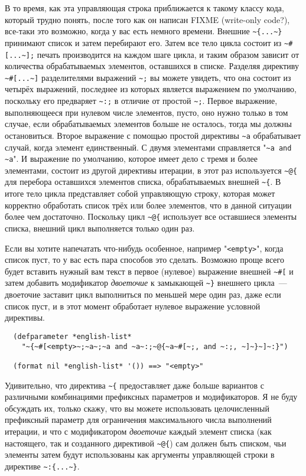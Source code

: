 В то время, как эта управляющая строка приближается к такому классу кода, который трудно понять, после того как
он написан FIXME (write-only code?), все-таки это возможно, когда у вас есть немного времени. Внешние
\lstinline!~{...~}! принимают список и затем перебирают его. Затем все тело цикла состоит из \lstinline!~#[...~];! печать
производится на каждом шаге цикла, и таким образом зависит от количества обрабатываемых элементов, оставшихся в
списке. Разделяя директиву \lstinline!~#[...~]! разделителями выражений \lstinline!~;! вы можете увидеть, что она состоит из
четырёх выражений, последнее из которых является выражением по умолчанию, поскольку его предваряет \lstinline!~:;! в
отличие от простой \lstinline!~;!. Первое выражение, выполняющееся при нулевом числе элементов, пусто, оно нужно только
в том случае, если обрабатываемых элементов больше не осталось, тогда мы должны остановиться. Второе выражение с
помощью простой директивы \lstinline!~a! обрабатывает случай, когда элемент единственный. С двумя элементами справляется
"\lstinline!~a and ~a!". И выражение по умолчанию, которое имеет дело с тремя и более элементами, состоит из другой
директивы итерации, в этот раз используется \lstinline!~@{! для перебора оставшихся элементов списка, обрабатываемых внешней
\lstinline!~{!. В итоге тело цикла представляет собой управляющую строку, которая может корректно обработать список трёх
или более элементов, что в данной ситуации более чем достаточно. Поскольку цикл \lstinline!~@{! использует все
оставшиеся элементы списка, внешний цикл выполняется только один раз.

Если вы хотите напечатать что-нибудь особенное, например "\lstinline!<empty>!", когда
список пуст, то у вас есть пара способов это сделать. Возможно проще всего будет вставить
нужный вам текст в первое (нулевое) выражение внешней \lstinline!~#[! и затем добавить
модификатор \textit{двоеточие} к замыкающей \lstinline!~}! внешнего цикла~--- двоеточие
заставит цикл выполниться по меньшей мере один раз, даже если список пуст, и в этот момент
 обработает нулевое выражение условной директивы.

\begin{verbatim}
  (defparameter *english-list*
    "~{~#[<empty>~;~a~;~a and ~a~:;~@{~a~#[~;, and ~:;, ~]~}~]~:}")

  (format nil *english-list* '()) ==> "<empty>"
\end{verbatim}

Удивительно, что директива \lstinline!~{! предоставляет даже больше вариантов с различными комбинациями префиксных
параметров и модификаторов. Я не буду обсуждать их, только скажу, что вы можете использовать целочисленный
префиксный параметр для ограничения максимального числа выполнений итерации, и что с модификатором \textit{двоеточие}
каждый элемент списка (как настоящего, так и созданного директивой \lstinline!~@{!) сам должен быть списком, чьи
элементы затем будут использованы как аргументы управляющей строки в директиве \lstinline!~:{...~}!.

